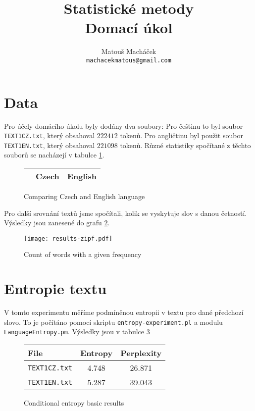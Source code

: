 \documentclass[11pt]{article}
\title{Statistické metody \\ Domací úkol}
\author{Matouš Macháček \\
  {\tt machacekmatous@gmail.com} }
\date{}
\begin{document}
\maketitle

\section{Data}

Pro účely domácího úkolu byly dodány dva soubory: Pro češtinu to byl soubor \texttt{TEXT1CZ.txt},
který obsahoval $222412$ tokenů. Pro angličtinu byl použit soubor \texttt{TEXT1EN.txt}, který
obsahoval $221098$ tokenů. Různé 
statistiky spočítané z těchto souborů se nacházejí v tabulce \ref{data}.

\begin{figure}
    \begin{center}
    \begin{tabular}{|l|c|c|}
        \hline
        & Czech & English \\
        \hline
        
        \hline
    \end{tabular}
    \end{center}
    \caption{Comparing Czech and English language}
    \label{data}
\end{figure}

Pro další srovnání textů jsme spočítali, kolik se vyskytuje slov s danou četností. Výsledky
jsou zanesené do grafu \ref{zipf}.

\begin{figure}
    \texttt{[image: results-zipf.pdf]}
    \caption{Count of words with a given frequency}
    \label{zipf}
\end{figure}

\section{Entropie textu}

V tomto experimentu měříme podmíněnou entropii v textu pro dané předchozí slovo. To je počítáno pomocí skriptu 
\texttt{entropy-experiment.pl} a modulu \texttt{LanguageEntropy.pm}. Výsledky jsou v tabulce \ref{entropy-basic-results}

\begin{figure}
    \begin{center}
    \begin{tabular}{|l|c|c|}
        \hline
        File & Entropy & Perplexity \\
        \hline
        \texttt{TEXT1CZ.txt} & 4.748 & 26.871 \\
        \texttt{TEXT1EN.txt} & 5.287 & 39.043 \\
        \hline
    \end{tabular}
    \end{center}
    \caption{Conditional entropy basic results }
    \label{entropy-basic-results}
\end{figure}
\end{document}

